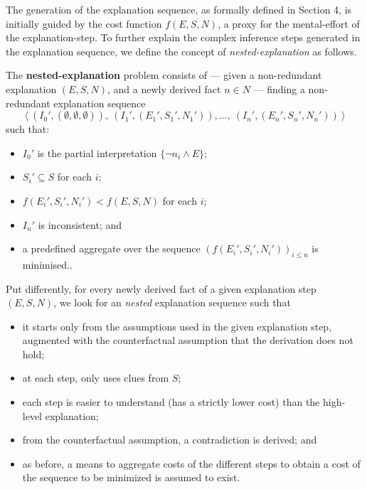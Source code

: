 




The generation of the explanation sequence, as formally defined in Section 4, is initially guided by the cost function $f(E, S, N)$, a proxy for the mental-effort of the explanation-step. 
To further explain the complex inference steps generated in the explanation sequence, we define the concept of \emph{nested-explanation} as follows. 

\begin{definition}
The \textbf{nested-explanation} problem consists of --- given a non-redundant explanation $(E, S, N)$, and a newly derived fact $n \in N$ --- finding a non-redundant explanation sequence 
    \[\langle \ (I_0',(\emptyset,\emptyset,\emptyset)),\ (I_1',(E_1',S_1',N_1')), \dots ,\ (I_n',(E_n',S_n',N_n')) \ \rangle\]
    such that:
    \begin{itemize}
        \item $I_0'$ is the partial interpretation $\{ \neg n_i \wedge E \}$;
        \item $S_i'\subseteq S$ for each $i$;
        \item $f(E_i',S_i',N_i')< f(E, S, N)$ for each $i$; 
        \item $I_n'$ is inconsistent; and
        \item a predefined aggregate over the sequence $\left(f(E_i',S_i',N_i')\right)_{i\leq n}$ is minimised..
    \end{itemize}
\end{definition}

Put differently, for every newly derived fact of a given explanation step $(E, S, N)$, we look for an \emph{nested} explanation sequence such that 
\begin{itemize}
 \item it starts only from the assumptions used in the given explanation step, augmented with the counterfactual assumption that the derivation does not hold; 
 \item at each step, only uses clues from $S$;
 \item each step is easier to understand (has a strictly lower cost) than the high-level explanation;
 \item from the counterfactual assumption, a contradiction is derived; and
 \item as before, a means to aggregate costs of the different steps to obtain a cost of the sequence to be minimized is assumed to exist.
\end{itemize}

